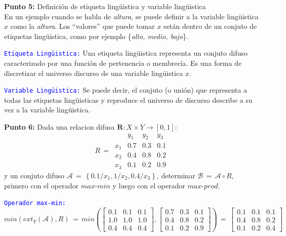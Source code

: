 \documentclass[10pt,onecolumn,twoside,letterpaper]{article}
\begin{document}
\par{\bf \large Punto 5:} Definici\'on de etiqueta ling\"uistica y variable ling\"uistica\\
En un ejemplo cuando se habla de \emph{altura}, se puede definir a la variable ling\"uistica $x$ como la \emph{altura}. Los ``valores'' que puede tomar $x$ est\'an dentro de un conjuto de etiquetas ling\"uistica, como por ejemplo \{\emph{alto, medio, bajo}\}.
\par \textcolor{blue}{\texttt{Etiqueta Ling\"uistica:}} Una etiqueta ling\"uistica representa un conjuto difuso caracterizado por una funci\'on de pertenencia o membrec\'ia. Es una forma de discretizar el universo discurso de una variable ling\"uistica $x$.
\par \textcolor{blue}{\texttt{Variable Ling\"uistica:}} Se puede decir, el conjuto (o uni\'on) que representa a todas las etiquetas ling\"uisticas y reproduce el universo de discurso describe a su vez a la variable ling\"uistica.
\par{\bf \large Punto 6:} Dada una relacion difusa $\mathbf{R}:X\times Y\to[0,1]$:\\
\begin{equation*}
  \label{eq:relation}
  R\,=\,
  \begin{array}{cccc}
    &y_1&y_2&y_3\\
    x_1&0.7&0.3&0.1\\
    x_2&0.4&0.8&0.2\\
    x_3&0.1&0.2&0.9
  \end{array}
\end{equation*}
y un conjuto difuso $\mathcal{A}\,=\,\left\{0.1/x_1,1/x_2,0.4/x_3\right\}$, determinar $\mathcal{B}\,=\,\mathcal{A}\circ R$, primero con el operador $max$-$min$ y luego con el operador $max$-$prod$.
\par \textcolor{blue}{\texttt{Operador max-min:}} 
\begin{equation*}
  \label{eq:relation}
  min(ext_Y(\mathcal{A}),R)\,=\,min\left(\left[
  \begin{array}{ccc}
    0.1&0.1&0.1\\
    1.0&1.0&1.0\\
    0.4&0.4&0.4
  \end{array}\right],\left[
  \begin{array}{ccc}
    0.7&0.3&0.1\\
    0.4&0.8&0.2\\
    0.1&0.2&0.9
  \end{array}\right]\right)\,=\,\left[
  \begin{array}{ccc}
    0.1&0.1&0.1\\
    0.4&0.8&0.2\\
    0.1&0.2&0.4
  \end{array}\right]
\end{equation*}
\end{document}
